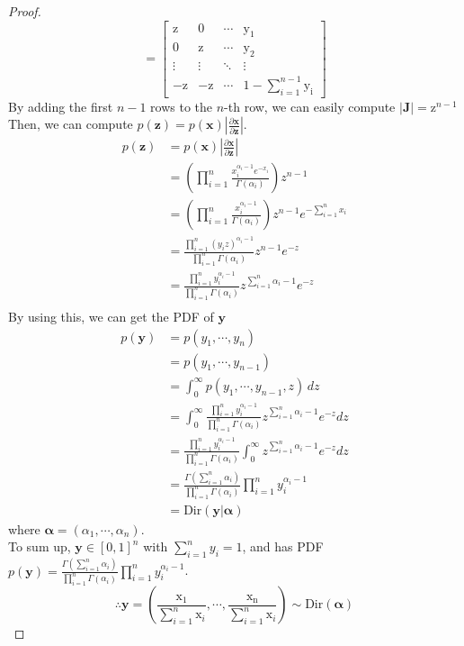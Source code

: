 \documentclass[11pt]{article}
\newcommand{\bmat}[1]{\begin{bmatrix}#1\end{bmatrix}}
\begin{document}
\begin{enumerate}
\begin{proof}
\[    =\bmat{\mathrm{z}&0&\cdots&\mathrm{y_{1}}\\
           \mathrm{0}&\mathrm{z}&\cdots&\mathrm{y_{2}}\\
           \vdots&\vdots&\ddots&\vdots\\
           \mathrm{-z}&\mathrm{-z}&\cdots&1-\sum_{i=1}^{n-1}\mathrm{y_{i}}}
    \]
    By adding the first $n-1$ rows to the $n$-th row, we can easily compute $|\bm J|=\mathrm{z}^{n-1}$
    Then, we can compute $p(\bm z)=p(\bm x)\left|\frac{\partial\mathbf{x}}{\partial\mathbf{z}}\right|$.
    \begin{align*}
    p(\bm z)
    &= p(\bm x)\left|\frac{\partial\mathbf{x}}{\partial\mathbf{z}}\right| \\
    &= \left(\prod_{i=1}^{n}\frac{x_{i}^{\alpha_{i}-1}e^{-x_{i}}}{\Gamma(\alpha_{i})}\right)z^{n-1} \\
    &= \left(\prod_{i=1}^{n}\frac{x_{i}^{\alpha_{i}-1}}{\Gamma(\alpha_{i})}\right)z^{n-1}e^{-\sum_{i=1}^{n}x_{i}} \\
    &= \frac{\prod_{i=1}^{n}(y_{i}z)^{\alpha_{i}-1}}{\prod_{i=1}^{n}\Gamma(\alpha_{i})}z^{n-1}e^{-z} \\
    &= \frac{\prod_{i=1}^{n}y_{i}^{\alpha_{i}-1}}{\prod_{i=1}^{n}\Gamma(\alpha_{i})}z^{\sum_{i=1}^{n}\alpha_{i}-1}e^{-z} \\
    \end{align*}
    By using this, we can get the PDF of $\mathbf{y}$
    \begin{align*}
    p(\bm y)&=p(y_{1},\cdots,y_{n}) \\
    &=p(y_{1},\cdots,y_{n-1}) \\
    &= \int_{0}^{\infty}p(y_{1},\cdots,y_{n-1},z)\,dz \\
    &= \int_{0}^{\infty}\frac{\prod_{i=1}^{n}y_{i}^{\alpha_{i}-1}}{\prod_{i=1}^{n}\Gamma(\alpha_{i})}z^{\sum_{i=1}^{n}\alpha_{i}-1}e^{-z}dz \\
    &= \frac{\prod_{i=1}^{n}y_{i}^{\alpha_{i}-1}}{\prod_{i=1}^{n}\Gamma(\alpha_{i})}\int_{0}^{\infty}z^{\sum_{i=1}^{n}\alpha_{i}-1}e^{-z}dz \\
    &= \frac{\Gamma\left(\sum_{i=1}^{n}\alpha_{i}\right)}{\prod_{i=1}^{n}\Gamma(\alpha_{i})}\prod_{i=1}^{n}y_{i}^{\alpha_{i}-1} \\
    &= \text{Dir}(\bm y|\bm\alpha)
    \end{align*}
    where $\bm\alpha=(\alpha_{1},\cdots,\alpha_{n})$.\\
    To sum up, $\mathbf{y}\in[0,1]^{n}$ with $\sum_{i=1}^{n}y_{i}=1$, and has PDF $p(\bm y)=\frac{\Gamma\left(\sum_{i=1}^{n}\alpha_{i}\right)}{\prod_{i=1}^{n}\Gamma(\alpha_{i})}\prod_{i=1}^{n}y_{i}^{\alpha_{i}-1}$.
    \[\therefore\mathbf{y}
    =\left(\frac{\mathrm{x_{1}}}{\sum_{i=1}^{n}\mathrm{x}_{i}},\cdots,\frac{\mathrm{x_{n}}}{\sum_{i=1}^{n}\mathrm{x}_{i}}\right)
    \sim\text{Dir}\left(\bm\alpha\right)\]
    \end{proof}
\end{enumerate}
\end{document}

